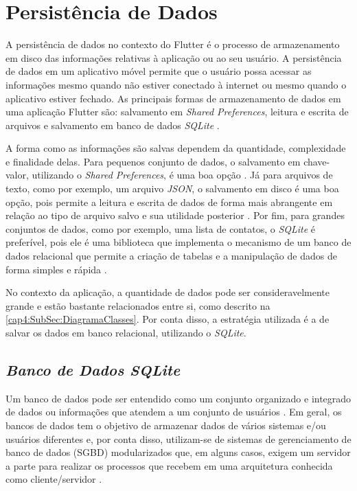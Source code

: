 \section{Persistência de Dados}
\label{cap2:Sec:PersistenciaDados}
A persistência de dados no contexto do Flutter é o processo de armazenamento em disco das informações relativas à aplicação ou ao seu usuário.
A persistência de dados em um aplicativo móvel permite que o usuário possa acessar as informações mesmo quando não estiver conectado à internet ou mesmo quando o aplicativo estiver fechado. As principais formas de armazenamento de dados em uma aplicação Flutter são: salvamento em \textit{Shared Preferences}, leitura e escrita de arquivos e salvamento em banco de dados \textit{SQLite} \cite{persistence}.

A forma como as informações são salvas dependem da quantidade, complexidade e finalidade delas. Para pequenos conjunto de dados, o salvamento em chave-valor, utilizando o \textit{Shared Preferences}, é uma boa opção \cite{shared_preferences}. Já para arquivos de texto, como por exemplo, um arquivo \textit{JSON}, o salvamento em disco é uma boa opção, pois permite a leitura e escrita de dados de forma mais abrangente em relação ao tipo de arquivo salvo e sua utilidade posterior \cite{reading_writing_files}. Por fim, para grandes conjuntos de dados, como por exemplo, uma lista de contatos, o \textit{SQLite} é preferível, pois ele é uma biblioteca que implementa o mecanismo de um banco de dados relacional \cite{sqlite-org} que permite a criação de tabelas e a manipulação de dados de forma simples e rápida \cite{sqlite-flutter} \cite{sqlite_features}.

No contexto da aplicação, a quantidade de dados pode ser consideravelmente grande e estão bastante relacionados entre si, como descrito na \ref{cap4:SubSec:DiagramaClasses}. Por conta disso, a estratégia utilizada é a de salvar os dados em banco relacional, utilizando o \textit{SQLite}.

\subsection{\textit{Banco de Dados SQLite}}
\label{cap2:SubSec:BancoSQLite}
Um banco de dados pode ser entendido como um conjunto organizado e integrado de dados ou informações que atendem a um conjunto de usuários \cite{heuser09banco} \cite{oracle}. Em geral, os bancos de dados tem o objetivo de armazenar dados de vários sistemas e/ou usuários diferentes e, por conta disso, utilizam-se de sistemas de gerenciamento de banco de dados (SGBD) modularizados \cite{heuser09banco} que, em alguns casos, exigem um servidor a parte para realizar os processos que recebem em uma arquitetura conhecida como cliente/servidor \cite{sqlitetutorial_net}.

